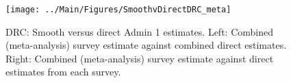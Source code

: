 \documentclass[12pt]{article}\usepackage[]{graphicx}\usepackage[]{color}
\newenvironment{knitrout}{}{} %
\begin{document}

\begin{knitrout}
\color{fgcolor}\begin{figure}[bht]

{\centering \texttt{[image: ../Main/Figures/SmoothvDirectDRC\_meta]} 

}

\caption[DRC]{DRC: Smooth versus direct Admin 1 estimates. Left: Combined (meta-analysis) survey estimate against combined direct estimates. Right: Combined (meta-analysis) survey estimate against direct estimates from each survey.}\label{fig:unnamed-chunk-93}
\end{figure}


\end{knitrout}
\end{document}
